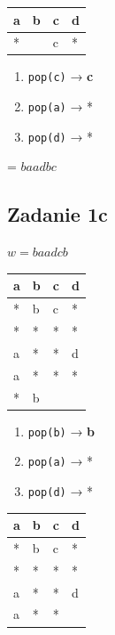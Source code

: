 \documentclass[11pt]{article}
\providecommand{\tightlist}{%
      \setlength{\itemsep}{0pt}\setlength{\parskip}{0pt}}
\begin{document}
\begin{longtable}[]{@{}llll@{}}
\toprule\noalign{}
a & b & c & d \\
\midrule\noalign{}
\endhead
\bottomrule\noalign{}
\endlastfoot
* & & c & * \\
\end{longtable}

\begin{enumerate}
\def\labelenumi{\arabic{enumi}.}
\tightlist
\item
  \texttt{pop(c)} → \textbf{c}
\item
  \texttt{pop(a)} → *
\item
  \texttt{pop(d)} → *
\end{enumerate}

= \(baadbc\)

    \hypertarget{zadanie-1c}{%
\subsection{Zadanie 1c}\label{zadanie-1c}}

\(w = baadcb\)

\begin{longtable}[]{@{}llll@{}}
\toprule\noalign{}
a & b & c & d \\
\midrule\noalign{}
\endhead
\bottomrule\noalign{}
\endlastfoot
* & b & c & * \\
* & * & * & * \\
a & * & * & d \\
a & * & * & * \\
* & b & & \\
\end{longtable}

\begin{enumerate}
\def\labelenumi{\arabic{enumi}.}
\tightlist
\item
  \texttt{pop(b)} → \textbf{b}
\item
  \texttt{pop(a)} → *
\item
  \texttt{pop(d)} → *
\end{enumerate}

\begin{longtable}[]{@{}llll@{}}
\toprule\noalign{}
a & b & c & d \\
\midrule\noalign{}
\endhead
\bottomrule\noalign{}
\endlastfoot
* & b & c & * \\
* & * & * & * \\
a & * & * & d \\
a & * & * & \\
\end{longtable}
\end{document}
